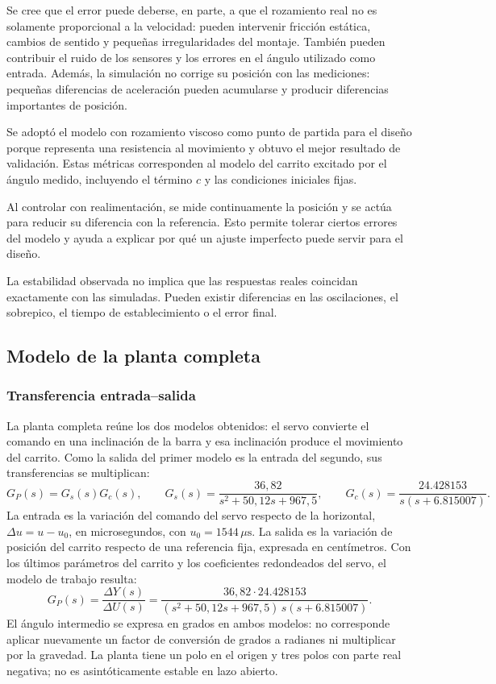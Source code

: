 \documentclass[a4paper, twoside, 10pt, spanish]{article}
\numberwithin{table}{section}
\begin{document}
    Se cree que el error puede deberse, en parte, a que el rozamiento real no es solamente proporcional a la velocidad: pueden intervenir fricción estática, cambios de sentido y pequeñas irregularidades del montaje. También pueden contribuir el ruido de los sensores y los errores en el ángulo utilizado como entrada. Además, la simulación no corrige su posición con las mediciones: pequeñas diferencias de aceleración pueden acumularse y producir diferencias importantes de posición.

    Se adoptó el modelo con rozamiento viscoso como punto de partida para el diseño porque representa una resistencia al movimiento y obtuvo el mejor resultado de validación. Estas métricas corresponden al modelo del carrito excitado por el ángulo medido, incluyendo el término $c$ y las condiciones iniciales fijas.

    Al controlar con realimentación, se mide continuamente la posición y se actúa para reducir su diferencia con la referencia. Esto permite tolerar ciertos errores del modelo y ayuda a explicar por qué un ajuste imperfecto puede servir para el diseño.

    La estabilidad observada no implica que las respuestas reales coincidan exactamente con las simuladas. Pueden existir diferencias en las oscilaciones, el sobrepico, el tiempo de establecimiento o el error final.

     \subsection{Modelo de la planta completa}
        \subsubsection{Transferencia entrada--salida}
    La planta completa reúne los dos modelos obtenidos: el servo convierte el comando en una inclinación de la barra y esa inclinación produce el movimiento del carrito. Como la salida del primer modelo es la entrada del segundo, sus transferencias se multiplican:
    \[
        G_P(s)=G_s(s)G_c(s),\qquad
        G_s(s)=\frac{36,82}{s^2+50,12s+967,5},\qquad
        G_c(s)=\frac{24.428153}{s(s+6.815007)}.
    \]
    La entrada es la variación del comando del servo respecto de la horizontal, $\Delta u=u-u_0$, en microsegundos, con $u_0=1544\,\mu\text{s}$. La salida es la variación de posición del carrito respecto de una referencia fija, expresada en centímetros. Con los últimos parámetros del carrito y los coeficientes redondeados del servo, el modelo de trabajo resulta:
    \begin{equation}
        G_P(s)=\frac{\Delta Y(s)}{\Delta U(s)}
        =\frac{36,82\cdot24.428153}
        {(s^2+50,12s+967,5)\,s(s+6.815007)}.
        \label{eq:planta_completa}
    \end{equation}
    El ángulo intermedio se expresa en grados en ambos modelos: no corresponde aplicar nuevamente un factor de conversión de grados a radianes ni multiplicar por la gravedad. La planta tiene un polo en el origen y tres polos con parte real negativa; no es asintóticamente estable en lazo abierto.
\end{document}
